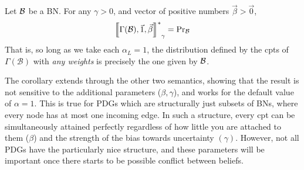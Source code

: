 \documentclass{article}
\newcommand{\commentout}[1]{\ignorespaces}
\DeclarePairedDelimiter{\UD}{\llbracket}{\rrbracket^*}
\numberwithin{equation}{section}
\begin{document}
    \begin{coro}
		Let $\cal B$ be a BN. For any $\gamma > 0$, and vector of positive numbers $\vec \beta > \vec 0$, 
		\[ \UD[\Big]{\Gamma(\mathcal B), \vec{1}, \vec \beta}_\gamma = \Pr\nolimits_{\cal B} \]
		That is, so long as we take each $\alpha_L = 1$, the distribution defined by the cpts of $\Gamma(\mathcal B)$ with \emph{any weights} is precisely the one given by $\cal B$.
	\end{coro}
	The corollary extends  through the other two semantics, showing that the result is not sensitive to the additional parameters ($\beta, \gamma$), and works for the default value of $\alpha = 1$.
	This is true for PDGs which are structurally just subsets of BNs, where every node has at most one incoming edge. In such a structure, every cpt can be simultaneously attained perfectly regardless of how little you are attached to them ($\beta$) and the strength of the bias towards uncertainty $(\gamma)$.
	However, not all PDGs have the particularly nice structure,
        and these parameters will be important once there starts to be
        possible conflict between beliefs.  

	

	
\end{document}
